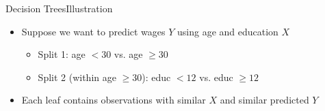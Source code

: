 \documentclass[hyperref={pdfpagelabels=false}]{beamer}
\begin{document}
\begin{frame}{Decision Trees}{Illustration}
	\begin{itemize}
		\item Suppose we want to predict wages $Y$ using age and education $X$
		\vspace{0.2cm}
		\begin{itemize}
			\item Split 1: age $< 30$ vs. age $\geq 30$
			\vspace{0.2cm}
			\item Split 2 (within age $\geq 30$): educ $< 12$ vs. educ $\geq 12$
		\end{itemize}
		\vspace{0.3cm}
		\item Each leaf contains observations with similar $X$ and similar predicted $Y$
	\end{itemize}
\end{frame}
\end{document}
